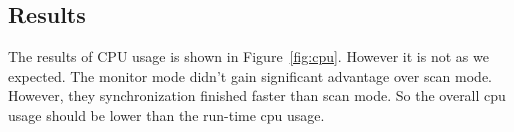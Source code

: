 \subsection{Results}
The results of CPU usage is shown in Figure~\ref{fig:cpu}. However it is not as we expected. The monitor mode didn't gain 
significant advantage over scan mode. However, they synchronization finished faster than scan mode. So the overall cpu 
usage should be lower than the run-time cpu usage. 

\begin{figure}%
\centering
{}
\hspace{0.20in}

\end{figure}
